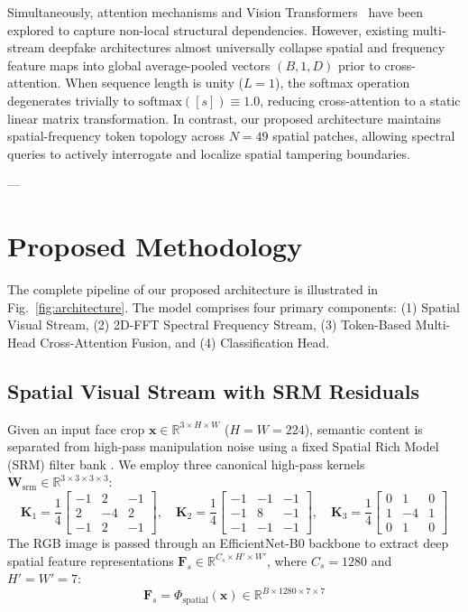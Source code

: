 \documentclass[journal,10pt,twocolumn]{article}
\begin{document}
Simultaneously, attention mechanisms and Vision Transformers~\cite{vaswani2017attention, zhao2021multi} have been explored to capture non-local structural dependencies. However, existing multi-stream deepfake architectures almost universally collapse spatial and frequency feature maps into global average-pooled vectors $(B, 1, D)$ prior to cross-attention. When sequence length is unity ($L=1$), the softmax operation degenerates trivially to $\text{softmax}([s]) \equiv 1.0$, reducing cross-attention to a static linear matrix transformation. In contrast, our proposed architecture maintains spatial-frequency token topology across $N=49$ spatial patches, allowing spectral queries to actively interrogate and localize spatial tampering boundaries.

---

\section{Proposed Methodology}
\label{sec:method}

The complete pipeline of our proposed architecture is illustrated in Fig.~\ref{fig:architecture}. The model comprises four primary components: (1) Spatial Visual Stream, (2) 2D-FFT Spectral Frequency Stream, (3) Token-Based Multi-Head Cross-Attention Fusion, and (4) Classification Head.

\subsection{Spatial Visual Stream with SRM Residuals}
Given an input face crop $\mathbf{x} \in \mathbb{R}^{3 \times H \times W}$ ($H=W=224$), semantic content is separated from high-pass manipulation noise using a fixed Spatial Rich Model (SRM) filter bank \cite{fridrich2012rich}. We employ three canonical high-pass kernels $\mathbf{W}_{\text{srm}} \in \mathbb{R}^{3 \times 3 \times 3 \times 3}$:
\begin{equation}
    \mathbf{K}_1 = \frac{1}{4}\begin{bmatrix} -1 & 2 & -1 \\ 2 & -4 & 2 \\ -1 & 2 & -1 \end{bmatrix}, \quad
    \mathbf{K}_2 = \frac{1}{4}\begin{bmatrix} -1 & -1 & -1 \\ -1 & 8 & -1 \\ -1 & -1 & -1 \end{bmatrix}, \quad
    \mathbf{K}_3 = \frac{1}{4}\begin{bmatrix} 0 & 1 & 0 \\ 1 & -4 & 1 \\ 0 & 1 & 0 \end{bmatrix}
\end{equation}
The RGB image is passed through an EfficientNet-B0 backbone \cite{tan2019efficientnet} to extract deep spatial feature representations $\mathbf{F}_s \in \mathbb{R}^{C_s \times H' \times W'}$, where $C_s = 1280$ and $H' = W' = 7$:
\begin{equation}
    \mathbf{F}_s = \Phi_{\text{spatial}}(\mathbf{x}) \in \mathbb{R}^{B \times 1280 \times 7 \times 7}
\end{equation}
\end{document}
